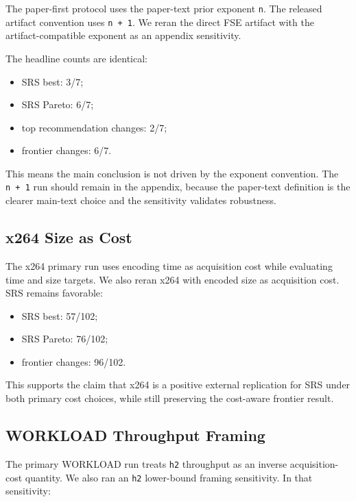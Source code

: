 \documentclass[smallcondensed]{svjour3}
\providecommand{\tightlist}{%
  \setlength{\itemsep}{0pt}\setlength{\parskip}{0pt}}
\begin{document}
The paper-first protocol uses the paper-text prior exponent \texttt{n}.
The released artifact convention uses \texttt{n\ +\ 1}. We reran the
direct FSE artifact with the artifact-compatible exponent as an appendix
sensitivity.

The headline counts are identical:

\begin{itemize}
\tightlist
\item
  SRS best: 3/7;
\item
  SRS Pareto: 6/7;
\item
  top recommendation changes: 2/7;
\item
  frontier changes: 6/7.
\end{itemize}

This means the main conclusion is not driven by the exponent convention.
The \texttt{n\ +\ 1} run should remain in the appendix, because the
paper-text definition is the clearer main-text choice and the
sensitivity validates robustness.

\subsection{x264 Size as Cost}\label{x264-size-as-cost}

The x264 primary run uses encoding time as acquisition cost while
evaluating time and size targets. We also reran x264 with encoded size
as acquisition cost. SRS remains favorable:

\begin{itemize}
\tightlist
\item
  SRS best: 57/102;
\item
  SRS Pareto: 76/102;
\item
  frontier changes: 96/102.
\end{itemize}

This supports the claim that x264 is a positive external replication for
SRS under both primary cost choices, while still preserving the
cost-aware frontier result.

\subsection{WORKLOAD Throughput
Framing}\label{workload-throughput-framing}

The primary WORKLOAD run treats \texttt{h2} throughput as an inverse
acquisition-cost quantity. We also ran an \texttt{h2} lower-bound
framing sensitivity. In that sensitivity:
\end{document}
